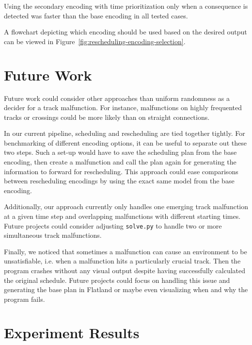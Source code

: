 \documentclass[runningheads]{llncs}
\begin{document}
Using the secondary encoding with time prioritization only when a consequence
is detected was faster than the base encoding in all tested cases.

A flowchart depicting which encoding should be used based on the desired output can be viewed in Figure~\ref{fig:rescheduling-encoding-selection}.

\section{Future Work}\label{future-work}
Future work could consider other approaches than uniform randomness as a decider for a track malfunction. For instance, malfunctions on highly frequented tracks or crossings could be more likely than on straight connections. 

In our current pipeline, scheduling and rescheduling are tied together tightly. For benchmarking of different encoding options, it can be useful to separate out these two steps. Such a set-up would have to save the scheduling plan from the base encoding, then create a malfunction and call the plan again for generating the information to forward for rescheduling. This approach could ease comparisons between rescheduling encodings by using the exact same model from the base encoding.

Additionally, our approach currently only handles one emerging track malfunction at a given time step and overlapping malfunctions with different starting times. Future projects could consider adjusting \verb|solve.py| to handle two or more simultaneous track malfunctions.

Finally, we noticed that sometimes a malfunction can cause an environment to be unsatisfiable, i.e. when a malfunction hits a particularly crucial track. Then the program crashes without any visual output despite having successfully calculated the original schedule. Future projects could focus on handling this issue and generating the base plan in Flatland or maybe even visualizing when and why the program fails.






\appendix
\section{Experiment Results}
\label{sec:appendix}

\setlength{\LTleft}{0pt}
\setlength{\LTright}{0pt}
\setlength{\tabcolsep}{4pt}
\end{document}
